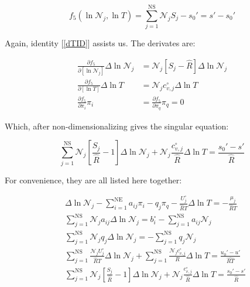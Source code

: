 \documentclass[10pt]{article}
\begin{document}
\begin{flushleft}
\begin{equation}
    f_5(\ln \mathcal{N}_j, \ln T) = \sum_{j=1}^\text{NS} \mathcal{N}_j S_j - s_0' = s' - s_0'
\end{equation}

Again, identity [\ref{dTID}] assists us. The derivates are:

\begin{align}
    \frac{\partial f_5}{\partial [\ln \mathcal{N}_j]} \Delta \ln \mathcal{N}_j &= \mathcal{N}_j [S_j - \hat{R}] \Delta \ln \mathcal{N}_j
    \\ \frac{\partial f_5}{\partial [\ln T]} \Delta \ln T &= \mathcal{N}_j c_{v,j}^\circ \Delta \ln T
    \\ \frac{\partial f_5}{\partial \pi_i} \pi_i &= \frac{\partial f_5}{\partial \pi_q} \pi_q = 0
\end{align}

Which, after non-dimensionalizing gives the singular equation:

\begin{equation}
    \boxed{\sum_{j=1}^\text{NS} \mathcal{N}_j \left[ \frac{S_j}{\hat{R}} - 1 \right] \Delta \ln \mathcal{N}_j + \mathcal{N}_j \frac{c_{v,j}^\circ}{\hat{R}} \Delta \ln T = \frac{s_0' - s'}{\hat{R}}}
\end{equation}


For convenience, they are all listed here together:

\begin{align}
        &\Delta \ln \mathcal{N}_j - \sum_{i=1}^\text{NE}a_{ij} \pi_i - q_j \pi_q -\frac{U_j^\circ}{\hat{R}T} \Delta \ln T  = -\frac{\mu_j}{\hat{R}T} 
        \label{HdlnNj}
        \\ &\sum_{j=1}^\text{NS}\mathcal{N}_j a_{ij} \Delta \ln \mathcal{N}_j = b_i^\circ - \sum_{j=1}^\text{NS} a_{ij} \mathcal{N}_j
        \label{Hdpi}
        \\ &\sum_{j=1}^\text{NS}\mathcal{N}_j q_j \Delta \ln \mathcal{N}_j = -\sum_{j=1}^\text{NS} q_j \mathcal{N}_j
        \label{Hdpiq}
        \\ &\sum_{j=1}^\text{NS}\frac{\mathcal{N}_jU_j^\circ}{\hat{R}T} \Delta \ln \mathcal{N}_j + \sum_{j=1}^\text{NS} \frac{ \mathcal{N}_jc_{v,j}^\circ}{R} \Delta \ln T = \frac{u_0' - u'}{\hat{RT}}
        \label{HdlnT}
        \\ &\sum_{j=1}^\text{NS} \mathcal{N}_j \left[ \frac{S_j}{\hat{R}} - 1 \right] \Delta \ln \mathcal{N}_j + \mathcal{N}_j \frac{c_{v,j}^\circ}{\hat{R}} \Delta \ln T = \frac{s_0' - s'}{\hat{R}}
        \label{HdlnTS}
\end{align}


\end{flushleft}
\end{document}

